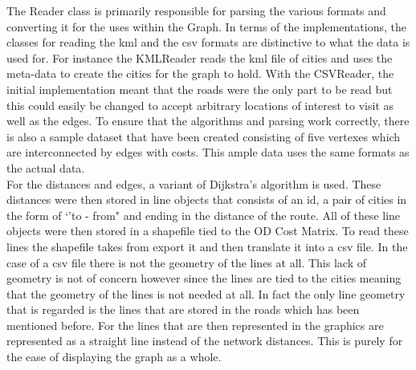 \documentclass[midd]{thesis}
\newcommand{\tab}{\hspace*{2em}}
\begin{document}
\tab The Reader class is primarily responsible for parsing the various formats and converting it for the uses within the Graph. In terms of the implementations, the classes for reading the kml and the csv formats are distinctive to what the data is used for. For instance the KMLReader reads the kml file of cities and uses the meta-data to create the cities for the graph to hold. With the CSVReader, the initial implementation meant that the roads were the only part to be read but this could easily be changed to accept arbitrary locations of interest to visit as well as the edges. To ensure that the algorithms and parsing work correctly, there is also a sample dataset that have been created consisting of five vertexes which are interconnected by edges with costs. This ample data uses the same formats as the actual data.\\
\tab For the distances and edges, a variant of Dijkstra's algorithm is used\cite{gis}. These distances were then stored in line objects that consists of an id, a pair of cities in the form of `'to - from" and ending in the distance of the route. All of these line objects were then stored in a shapefile tied to the OD Cost Matrix. To read these lines the shapefile takes from export it and then translate it into a csv file. In the case of a csv file there is not the geometry of the lines at all. This lack of geometry is not of concern however since the lines are tied to the cities meaning that the geometry of the lines is not needed at all. In fact the only line geometry that is regarded is the lines that are stored in the roads which has been mentioned before. For the lines that are then represented in the graphics are represented as a straight line instead of the network distances. This is purely for the ease of displaying the graph as a whole.\\ 
\end{document}
